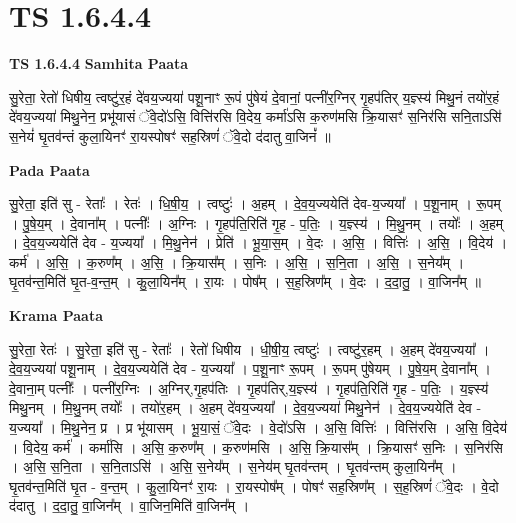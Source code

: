 \documentclass[17pt]{extarticle}
\begin{document}
\section{ TS 1.6.4.4 }

\textbf{TS 1.6.4.4 } \newline
\textbf{Samhita Paata} \newline

सु॒रेता॒ रेतो॑ धिषीय॒ त्वष्टु॑र॒हं दे॑वय॒ज्यया॑ पशू॒नाꣳ रू॒पं पु॑षेयं दे॒वानां॒ पत्नी॑र॒ग्निर् गृ॒हप॑तिर् य॒ज्ञ्स्य॑ मिथु॒नं तयो॑र॒हं दे॑वय॒ज्यया॑ मिथु॒नेन॒ प्रभू॑यासं ॅवे॒दो॑ऽसि॒ वित्ति॑रसि वि॒देय॒ कर्मा॑ऽसि क॒रुण॑मसि क्रि॒यासꣳ॑ स॒निर॑सि सनि॒ताऽसि॑ स॒नेयं॑ घृ॒तव॑न्तं कुला॒यिनꣳ॑ रा॒यस्पोषꣳ॑ सह॒स्रिणं॑ ॅवे॒दो द॑दातु वा॒जिनं᳚ ॥ \newline

\textbf{Pada Paata} \newline

सु॒रेता॒ इति॑ सु - रेताः᳚ । रेतः॑ । धि॒षी॒य॒ । त्वष्टुः॑ । अ॒हम् । दे॒व॒य॒ज्ययेति॑ देव-य॒ज्यया᳚ । प॒शू॒नाम् । रू॒पम् । पु॒षे॒य॒म् । दे॒वाना᳚म् । पत्नीः᳚ । अ॒ग्निः । गृ॒हप॑ति॒रिति॑ गृ॒ह - प॒तिः॒ । य॒ज्ञ्स्य॑ । मि॒थु॒नम् । तयोः᳚ । अ॒हम् । दे॒व॒य॒ज्ययेति॑ देव - य॒ज्यया᳚ । मि॒थु॒नेन॑ । प्रेति॑ । भू॒या॒स॒म् । वे॒दः । अ॒सि॒ । वित्तिः॑ । अ॒सि॒ । वि॒देय॑ । कर्म॑ । अ॒सि॒ । क॒रुण᳚म् । अ॒सि॒ । क्रि॒यास᳚म् । स॒निः । अ॒सि॒ । स॒नि॒ता । अ॒सि॒ । स॒नेय᳚म् । घृ॒तव॑न्त॒मिति॑ घृ॒त-व॒न्त॒म् । कु॒ला॒यिन᳚म् । रा॒यः । पोष᳚म् । स॒ह॒स्रिण᳚म् । वे॒दः । द॒दा॒तु॒ । वा॒जिन᳚म् ॥  \newline


\textbf{Krama Paata} \newline

सु॒रेता॒ रेतः॑ । सु॒रेता॒ इति॑ सु - रेताः᳚ । रेतो॑ धिषीय । धी॒षी॒य॒ त्वष्टुः॑ । त्वष्टु॑र॒हम् । अ॒हम् दे॑वय॒ज्यया᳚ । दे॒व॒य॒ज्यया॑ पशू॒नाम् । दे॒व॒य॒ज्ययेति॑ देव - य॒ज्यया᳚ । प॒शू॒नाꣳ रू॒पम् । रू॒पम् पु॑षेयम् । पु॒षे॒य॒म् दे॒वाना᳚म् । दे॒वाना॒म् पत्नीः᳚ । पत्नी॑र॒ग्निः । अ॒ग्निर्,गृ॒हप॑तिः । गृ॒हप॑तिर्,य॒ज्ञ्स्य॑ । गृ॒हप॑ति॒रिति॑ गृ॒ह - प॒तिः॒ । य॒ज्ञ्स्य॑ मिथु॒नम् । मि॒थु॒नम् तयोः᳚ । तयो॑र॒हम् । अ॒हम् दे॑वय॒ज्यया᳚ । दे॒व॒य॒ज्यया॑ मिथु॒नेन॑ । दे॒व॒य॒ज्ययेति॑ देव - य॒ज्यया᳚ । मि॒थु॒नेन॒ प्र । प्र भू॑यासम् । भू॒या॒सं॒ ॅवे॒दः । वे॒दो॑ऽसि । अ॒सि॒ वित्तिः॑ । वित्ति॑रसि । अ॒सि॒ वि॒देय॑ । वि॒देय॒ कर्म॑ । कर्मा॑सि । अ॒सि॒ क॒रुण᳚म् । क॒रुण॑मसि । अ॒सि॒ क्रि॒यास᳚म् । क्रि॒यासꣳ॑ स॒निः । स॒निर॑सि । अ॒सि॒ स॒नि॒ता । स॒नि॒ताऽसि॑ । अ॒सि॒ स॒नेय᳚म् । स॒नेय॑म् घृ॒तव॑न्तम् । घृ॒तव॑न्तम् कुला॒यिन᳚म् । घृ॒तव॑न्त॒मिति॑ घृ॒त - व॒न्त॒म् । कु॒ला॒यिनꣳ॑ रा॒यः । रा॒यस्पोष᳚म् । पोषꣳ॑ सह॒स्रिण᳚म् । स॒ह॒स्रिणं॑ ॅवे॒दः । वे॒दो द॑दातु । द॒दा॒तु॒ वा॒जिन᳚म् । वा॒जिन॒मिति॑ वा॒जिन᳚म् । \newline
\end{document}
